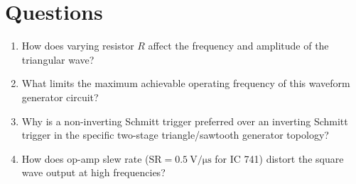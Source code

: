 \section{Questions}
\begin{enumerate}
	\item How does varying resistor $R$ affect the frequency and amplitude of the triangular wave?
\item What limits the maximum achievable operating frequency of this waveform generator circuit?
\item Why is a non-inverting Schmitt trigger preferred over an inverting Schmitt trigger in the specific two-stage triangle/sawtooth generator topology?
\item How does op-amp slew rate ($\text{SR} = \SI{0.5}{\volt/\micro\second}$ for IC 741) distort the square wave output at high frequencies?
\end{enumerate}